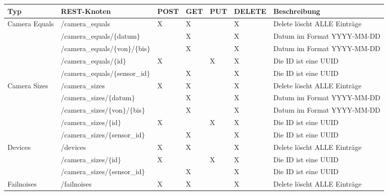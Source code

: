 \begin{landscape}
  \begin{table}[H]
    \begin{longtable}{lllllll}
      \textbf{Typ} & \textbf{REST-Knoten} & \textbf{POST} & \textbf{GET} & \textbf{PUT} & \textbf{DELETE} & \textbf{Beschreibung} \\ \toprule
      \multirow{5}{*}{Camera Equals}  & /camera\_equals               & X & X & & X & Delete löscht ALLE Einträge   \\
                                      & /camera\_equals/$\{$datum$\}$       &  & X & & X & Datum im Format YYYY-MM-DD     \\
                                      & /camera\_equals/$\{$von$\}$/$\{$bis$\}$   &  & X & & X & Datum im Format YYYY-MM-DD     \\
                                      & /camera\_equals/$\{$id$\}$          & X & & X & X & Die ID ist eine UUID          \\
                                      & /camera\_equals/$\{$sensor\_id$\}$  &  & X & & X & Die ID ist eine UUID           \\ \midrule
      \multirow{5}{*}{Camera Sizes}   & /camera\_sizes                & X & X & & X & Delete löscht ALLE Einträge   \\
                                      & /camera\_sizes/$\{$datum$\}$        &  & X & & X & Datum im Format YYYY-MM-DD     \\
                                      & /camera\_sizes/$\{$von$\}$/$\{$bis$\}$    &  & X & & X & Datum im Format YYYY-MM-DD     \\
                                      & /camera\_sizes/$\{$id$\}$           & X & & X & X & Die ID ist eine UUID          \\
                                      & /camera\_sizes/$\{$sensor\_id$\}$   &  & X & & X & Die ID ist eine UUID           \\ \midrule
      \multirow{3}{*}{Devices}        & /devices                      & X & X & & X & Delete löscht ALLE Einträge   \\
                                      & /camera\_sizes/$\{$id$\}$           & X & & X & X & Die ID ist eine UUID          \\
                                      & /camera\_sizes/$\{$sensor\_id$\}$   &  & X & & X & Die ID ist eine UUID           \\ \midrule
      \multirow{5}{*}{Failnoises}     & /failnoises                   & X & X & & X & Delete löscht ALLE Einträge   \\

\end{longtable}
\end{table}
\end{landscape}
